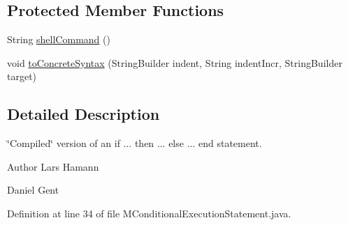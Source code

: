 \subsection*{Protected Member Functions}
\begin{DoxyCompactItemize}
\item 
String \hyperlink{classorg_1_1tzi_1_1use_1_1uml_1_1sys_1_1soil_1_1_m_conditional_execution_statement_aedafde1f290c29d235a220cd0d3aaccd}{shell\-Command} ()
\item 
void \hyperlink{classorg_1_1tzi_1_1use_1_1uml_1_1sys_1_1soil_1_1_m_conditional_execution_statement_a2a04a37566082848c969bd90091af16e}{to\-Concrete\-Syntax} (String\-Builder indent, String indent\-Incr, String\-Builder target)
\end{DoxyCompactItemize}


\subsection{Detailed Description}
\char`\"{}\-Compiled\char`\"{} version of an {\ttfamily if ... then ... else ... end} statement. \begin{DoxyAuthor}{Author}
Lars Hamann 

Daniel Gent 
\end{DoxyAuthor}


Definition at line 34 of file M\-Conditional\-Execution\-Statement.\-java.



